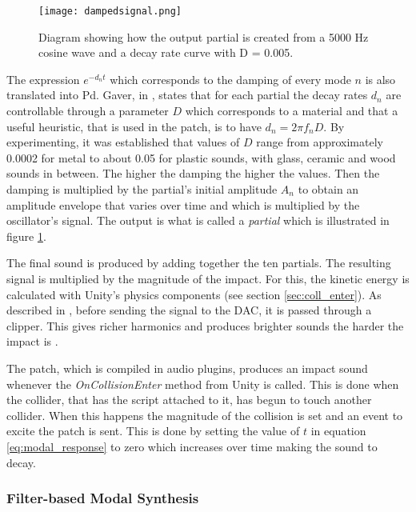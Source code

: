 \begin{figure}[H]
  \centering
    \texttt{[image: dampedsignal.png]}
      \caption{Diagram showing how the output partial is created from a 5000 Hz cosine wave and a decay rate curve with D = 0.005.}
      \label{fig:dampedsignal}
\end{figure}

The expression $e^{-d_n t}$ which corresponds to the damping of every mode $n$ is also translated into \gls{Pd}. Gaver, in \cite{gaver1993we}, states that for each partial the decay rates $d_n$ are controllable through a parameter $D$ which corresponds to a material and that a useful heuristic, that is used in the patch, is to have $d_n = 2 \pi f_nD$. By experimenting, it was established that values of $D$ range from approximately 0.0002 for metal to about 0.05 for plastic sounds, with glass, ceramic and wood sounds in between. The higher the damping the higher the values. Then the damping is multiplied by the partial's initial amplitude $A_n$ to obtain an amplitude envelope that varies over time and which is multiplied by the oscillator's signal. The output is what is called a \textit{partial} which is illustrated in figure \ref{fig:dampedsignal}. 

The final sound is produced by adding together the ten partials. The resulting signal is multiplied by the magnitude of the impact. For this, the kinetic energy is calculated with Unity\textsuperscript{\textregistered}'s physics components (see section \ref{sec:coll_enter}). As described in \cite{farnell2010designing}, before sending the signal to the \gls{DAC}, it is passed through a clipper. This gives richer harmonics and produces brighter sounds the harder the impact is \cite{aramaki2009thinking}.

The patch, which is compiled in audio plugins, produces an impact sound whenever the \textit{OnCollisionEnter} \cite{bib:unity_doc} method from Unity\textsuperscript{\textregistered} is called. This is done when the collider, that has the script attached to it, has begun to touch another collider. When this happens the magnitude of the collision is set and an event to excite the patch is sent. This is done by setting the value of $t$ in equation \ref{eq:modal_response} to zero which increases over time making the sound to decay.

\subsubsection{Filter-based Modal Synthesis}\label{sec:filter_synth}

